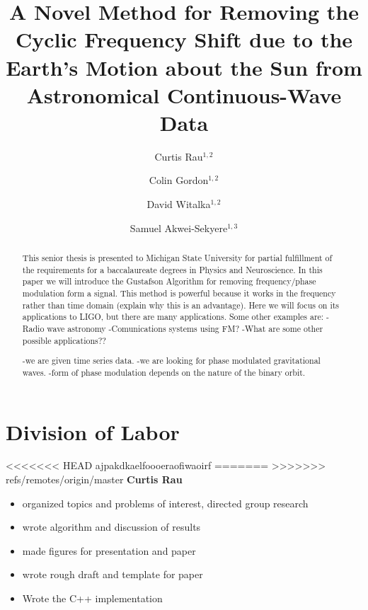 \documentclass[onecolumn, groupedaddress, 10pt]{revtex4-1}
\begin{document}
\author{Curtis Rau$^{1,2}$}
\author{Colin Gordon$^{1,2}$}
\author{David Witalka$^{1,2}$}
\author{Samuel Akwei-Sekyere$^{1,3}$}

\title{A Novel Method for Removing the Cyclic Frequency Shift due to the Earth's Motion about the Sun from Astronomical Continuous-Wave Data}


\begin{abstract}
This senior thesis is presented to Michigan State University for partial fulfillment of the requirements for a baccalaureate degrees in Physics and Neuroscience.
In this paper we will introduce the Gustafson Algorithm for removing frequency/phase modulation form a signal.  This method is powerful because it works in the frequency rather than time domain (explain why this is an advantage).  Here we will focus on its applications to LIGO, but there are many applications.  Some other examples are:
-Radio wave astronomy
-Comunications systems using FM?
-What are some other possible applications??

-we are given time series data.
-we are looking for phase modulated gravitational waves.
-form of phase modulation depends on the nature of the binary orbit.
\citep{Saulson}
\citep{LSCall}
\citep{Deanna}
\citep{folland}
\citep{griffiths}
\end{abstract}

\maketitle


\pagebreak

\section*{Division of Labor}
<<<<<<< HEAD
ajpakdkaelfoooeraofiwaoirf
=======
>>>>>>> refs/remotes/origin/master
\textbf{Curtis Rau}
\begin{itemize}
\item organized topics and problems of interest, directed group research
\item wrote algorithm and discussion of results
\item made figures for presentation and paper
\item wrote rough draft and template for paper
\item Wrote the C++ implementation
\end{itemize}
\end{document}

